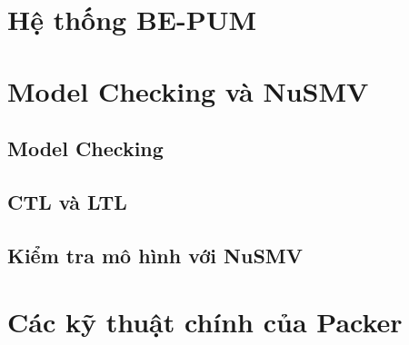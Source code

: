 \section{Hệ thống BE-PUM}

\section{Model Checking và NuSMV}

\subsection{Model Checking}

\subsection{CTL và LTL}

\subsection{Kiểm tra mô hình với NuSMV}

\section{Các kỹ thuật chính của Packer}
